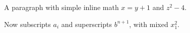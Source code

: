 A paragraph with simple inline math $x = y + 1$ and $z^2 - 4$.

Now subscripts $a_i$ and superscripts $b^{n+1}$, with mixed $x_1^2$.
